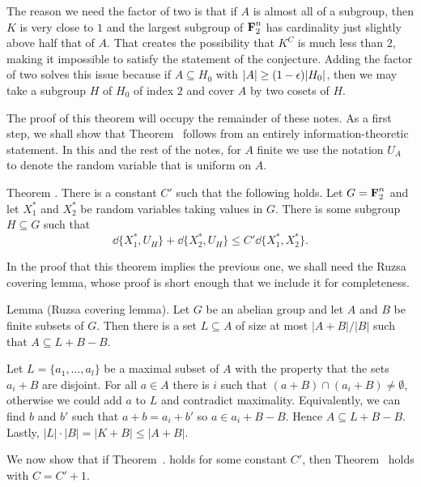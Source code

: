 The reason we need the factor of two is that if $A$ is almost all of a subgroup, then $K$ is very close
to $1$ and the largest
subgroup of $\hbox{\bf F}_2^n$ has cardinality just slightly above half that of $A$. That creates the possibility
that $K^C$ is much less than $2$, making it impossible to satisfy the statement of the conjecture.
Adding the factor of two solves this issue because if $A\subseteq H_0$ with $|A| \ge (1-\epsilon)|H_0|$, then
we may take a subgroup $H$ of $H_0$ of index $2$ and cover $A$ by two cosets of $H$.

The proof of this theorem will occupy the
remainder of these notes. As a first step, we shall show that
Theorem~{\thmpfr} follows from an entirely information-theoretic statement.
In this and the rest of the notes, for $A$ finite
we use the notation $U_A$ to denote the random variable that is uniform on $A$.

\edef\thmsubgroup{\the\sectcount.\the\thmcount}
\proclaim Theorem \advthm. There is a constant $C'$ such that the following holds.
Let $G = \hbox{\bf F}_2^n$ and let $X_1^*$ and $X_2^*$ be random variables taking values in
$G$. There is some subgroup $H\subseteq G$ such that
$$\dd\{ X_1^*, U_H\} + \dd\{ X_2^*, U_H\} \le C'\dd\{X_1^*, X_2^*\}.$$

In the proof that this theorem implies the previous one, we shall need the Ruzsa covering lemma,
whose proof is short enough that we include it for completeness.

\edef\lemruzsacovering{\the\sectcount.\the\thmcount}
\parenproclaim Lemma {\advthm} (Ruzsa covering lemma). Let $G$ be an abelian group and let $A$ and
$B$ be finite subsets of $G$. Then there is a set $L\subseteq A$ of size at most $|A+B|/|B|$ such that
$A\subseteq L+B-B$.

\proof Let $L = \{a_1,\ldots,a_l\}$ be a maximal subset of $A$ with the property that the sets $a_i+B$
are disjoint. For all $a\in A$ there is $i$ such that $(a+B) \cap (a_i+B) \ne \emptyset$, otherwise we
could add $a$ to $L$ and contradict maximality. Equivalently, we can find $b$ and $b'$ such that
$a+b = a_i + b'$ so $a\in a_i + B - B$. Hence $A\subseteq L+B-B$. Lastly, $|L|\cdot |B| = |K+B| \le |A+B|$.\slug

We now show that if Theorem~{\thmsubgroup} holds for some constant $C'$, then
Theorem~{\thmpfr} holds with $C=C'+1$.

